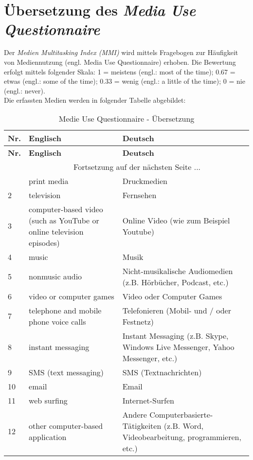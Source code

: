 \section{Übersetzung des \textit{Media Use Questionnaire}}\label{appendix.muq}
Der \textit{Medien Multitasking Index (MMI)} \cite{Ophir2009} wird mittels Fragebogen zur Häufigkeit von Mediennutzung (engl. Media Use Questionnaire) erhoben. Die Bewertung erfolgt mittels folgender Skala: 1 = meistens (engl.: most of the time); 0.67 = etwas (engl.: some of the time); 0.33 = wenig (engl.: a little of the time); 0 = nie (engl.: never).  \\
Die erfassten Medien werden in folgender Tabelle abgebildet:
\begin{center}
    \begin{longtable}[t]{|l|p{6.6 cm}|p{6.6 cm}|}
    \caption{Medie Use Questionnaire - Übersetzung} \\ \hline
        \textbf{Nr.} & \textbf{Englisch} & \textbf{Deutsch} \\ \hline
        \endfirsthead
        \hline
        \textbf{Nr.} & \textbf{Englisch} & \textbf{Deutsch} \\ \hline
        \endhead 
        & \multicolumn{2}{|c|}{Fortsetzung auf der nächsten Seite $...$ } \\ \hline
        \endfoot
        \hline
        \endlastfoot
        1 & print media & Druckmedien \\
        2 & television & Fernsehen \\
        3 & computer-based video (such as YouTube or online television episodes) & Online Video (wie zum Beispiel Youtube) \\
        4 & music & Musik \\
        5 & nonmusic audio & Nicht-musikalische Audiomedien (z.B. Hörbücher, Podcast, etc.) \\
        6 & video or computer games & Video oder Computer Games \\
        7 & telephone and mobile phone voice calls & Telefonieren (Mobil- und / oder Festnetz) \\
        8 & instant messaging & Instant Messaging (z.B. Skype, Windows Live Messenger, Yahoo Messenger, etc.) \\
        9 & SMS (text messaging) & SMS (Textnachrichten) \\
        10 & email & Email \\
        11 & web surfing & Internet-Surfen \\
        12 & other computer-based application  & Andere Computerbasierte-Tätigkeiten (z.B. Word, Videobearbeitung, programmieren, etc.) \\
        \end{longtable}
	\label{tab:MuqUebersetzung}
\end{center}


